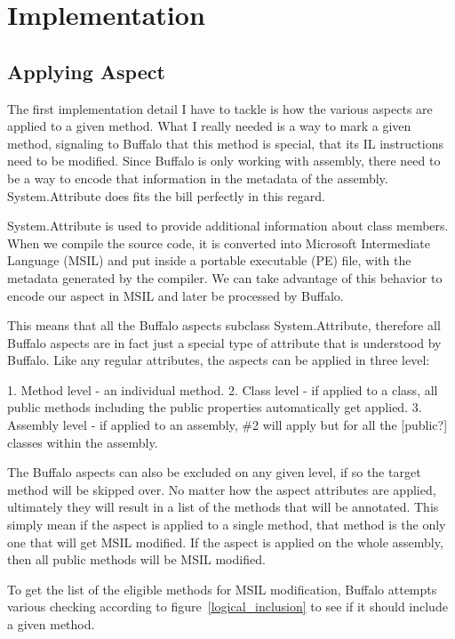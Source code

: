 \chapter{Implementation}

\section{Applying Aspect}

The first implementation detail I have to tackle is how the various aspects are applied to a given method. What I really needed is a way to mark a given method, signaling to Buffalo that this method is special, that its IL instructions need to be modified. Since Buffalo is only working with assembly, there need to be a way to encode that information in the metadata of the assembly. System.Attribute does fits the bill perfectly in this regard.

System.Attribute is used to provide additional information about class members. When we compile the source code, it is converted into Microsoft Intermediate Language (MSIL) and put inside a portable executable (PE) file, with the metadata generated by the compiler. We can take advantage of this behavior to encode our aspect in MSIL and later be processed by Buffalo.

This means that all the Buffalo aspects subclass System.Attribute, therefore all Buffalo aspects are in fact just a special type of attribute that is understood by Buffalo. Like any regular attributes, the aspects can be applied in three level:

1. Method level - an individual method.
2. Class level - if applied to a class, all public methods including the public properties automatically get applied.
3. Assembly level - if applied to an assembly, \#2 will apply but for all the [public?] classes within the assembly.

The Buffalo aspects can also be excluded on any given level, if so the target method will be skipped over. No matter how the aspect attributes are applied, ultimately they will result in a list of the methods that will be annotated. This simply mean if the aspect is applied to a single method, that method is the only one that will get MSIL modified. If the aspect is applied on the whole assembly, then all public methods will be MSIL modified.

To get the list of the eligible methods for MSIL modification, Buffalo attempts various checking according to figure~\ref{logical_inclusion} to see if it should include a given method.

